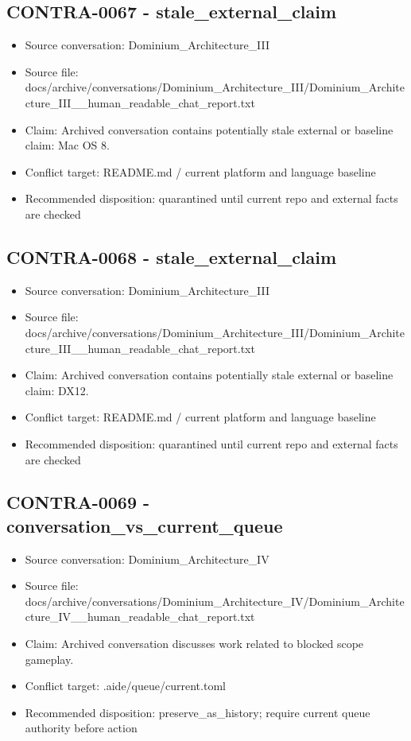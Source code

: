 \documentclass[11pt,a4paper]{report}
\begin{document}
\subsection{CONTRA-0067 - stale\_external\_claim}

\begin{itemize}
\item Source conversation: Dominium\_Architecture\_III
\item Source file: docs/archive/conversations/Dominium\_Architecture\_III/Dominium\_Architecture\_III\_\_human\_readable\_chat\_report.txt
\item Claim: Archived conversation contains potentially stale external or baseline claim: Mac OS 8.
\item Conflict target: README.md / current platform and language baseline
\item Recommended disposition: quarantined until current repo and external facts are checked
\end{itemize}

\subsection{CONTRA-0068 - stale\_external\_claim}

\begin{itemize}
\item Source conversation: Dominium\_Architecture\_III
\item Source file: docs/archive/conversations/Dominium\_Architecture\_III/Dominium\_Architecture\_III\_\_human\_readable\_chat\_report.txt
\item Claim: Archived conversation contains potentially stale external or baseline claim: DX12.
\item Conflict target: README.md / current platform and language baseline
\item Recommended disposition: quarantined until current repo and external facts are checked
\end{itemize}

\subsection{CONTRA-0069 - conversation\_vs\_current\_queue}

\begin{itemize}
\item Source conversation: Dominium\_Architecture\_IV
\item Source file: docs/archive/conversations/Dominium\_Architecture\_IV/Dominium\_Architecture\_IV\_\_human\_readable\_chat\_report.txt
\item Claim: Archived conversation discusses work related to blocked scope gameplay.
\item Conflict target: .aide/queue/current.toml
\item Recommended disposition: preserve\_as\_history; require current queue authority before action
\end{itemize}
\end{document}
